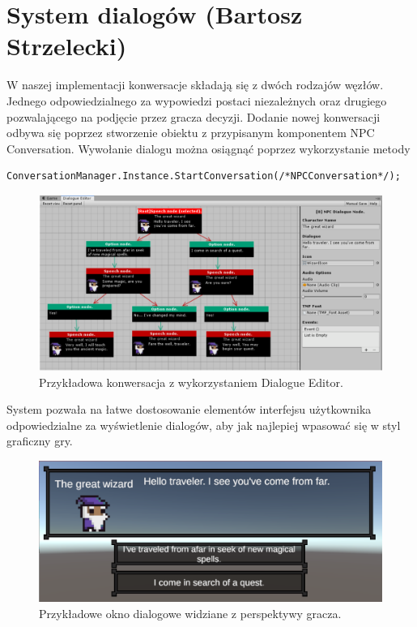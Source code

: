 \section{System dialogów (Bartosz Strzelecki)}

W naszej implementacji konwersacje składają się z dwóch rodzajów węzłów. Jednego odpowiedzialnego za wypowiedzi postaci niezależnych oraz drugiego
pozwalającego na podjęcie przez gracza decyzji.
Dodanie nowej konwersacji odbywa się poprzez stworzenie obiektu z przypisanym komponentem NPC Conversation.
Wywołanie dialogu można osiągnąć poprzez wykorzystanie metody


\begin{verbatim}
ConversationManager.Instance.StartConversation(/*NPCConversation*/);
\end{verbatim}

\begin{figure}[h]
\centering
\includegraphics[width=1\textwidth]{images/dial}
\caption{Przykładowa konwersacja z wykorzystaniem Dialogue Editor.}
\end{figure}
System pozwała na łatwe dostosowanie elementów interfejsu użytkownika odpowiedzialne za wyświetlenie dialogów, aby jak najlepiej wpasować się
w styl graficzny gry.

\begin{figure}[h]
\centering
\includegraphics[width=1\textwidth]{images/d}
\caption{Przykładowe okno dialogowe widziane z perspektywy gracza.}
\end{figure}
